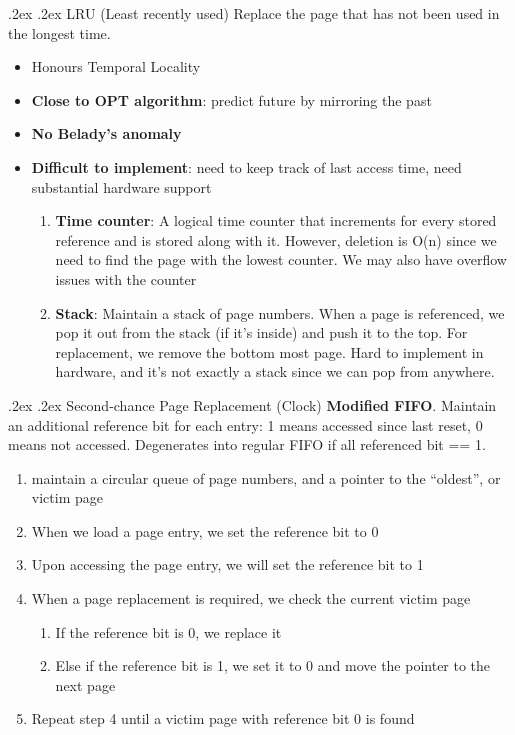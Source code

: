 \documentclass[13pt,landscape,a4paper]{article}
\makeatletter
\renewcommand{\subsubsection}{\@startsection{subsubsection}{1}{0mm}%
    {.2ex}%
    {.2ex}%
    {\rmfamily\bfseries}}
\makeatother
\begin{document}
\begin{multicols*}{3}
        \subsubsection{LRU (Least recently used)}
        Replace the page that has not been used in the longest time.
        \begin{itemize}
            \item Honours Temporal Locality
            \item \textbf{Close to OPT algorithm}: predict future by mirroring the past
            \item \textbf{No Belady’s anomaly}
            \item \textbf{Difficult to implement}: need to keep track of last access time, need substantial hardware support
            \begin{enumerate}
                \item \textbf{Time counter}: A logical time counter that increments for every stored reference and is stored along with it. However, deletion is O(n) since we need to find the page with the lowest counter. We may also have overflow issues with the counter
                \item \textbf{Stack}: Maintain a stack of page numbers. When a page is referenced, we pop it out from the stack (if it’s inside) and push it to the top. For replacement, we remove the bottom most page. Hard to implement in hardware, and it’s not exactly a stack since we can pop from anywhere.
            \end{enumerate}
        \end{itemize}
        \subsubsection{Second-chance Page Replacement (Clock)}
        \textbf{Modified FIFO}. Maintain an additional reference bit for each entry: 1 means accessed since last reset, 0 means not accessed. Degenerates into regular FIFO if all referenced bit == 1.
        \begin{enumerate}
            \item maintain a circular queue of page numbers, and a pointer to the “oldest”, or victim page
            \item When we load a page entry, we set the reference bit to 0
            \item Upon accessing the page entry, we will set the reference bit to 1
            \item When a page replacement is required, we check the current victim page
            \begin{enumerate}
                \item If the reference bit is 0, we replace it
                \item Else if the reference bit is 1, we set it to 0 and move the pointer to the next page
            \end{enumerate}
            \item Repeat step 4 until a victim page with reference bit 0 is found
        \end{enumerate}

\end{multicols*}
\end{document}
